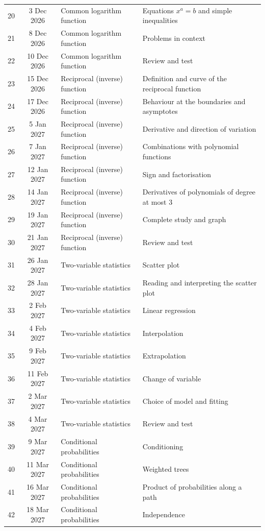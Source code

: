 \begin{longtable}{cclp{}}
20 & 3 Dec 2026 & Common logarithm function & Equations $x^a=b$ and simple inequalities\\
21 & 8 Dec 2026 & Common logarithm function & Problems in context\\
22 & 10 Dec 2026 & Common logarithm function & Review and test\\
23 & 15 Dec 2026 & Reciprocal (inverse) function & Definition and curve of the reciprocal function\\
24 & 17 Dec 2026 & Reciprocal (inverse) function & Behaviour at the boundaries and asymptotes\\
25 & 5 Jan 2027 & Reciprocal (inverse) function & Derivative and direction of variation\\
26 & 7 Jan 2027 & Reciprocal (inverse) function & Combinations with polynomial functions\\
27 & 12 Jan 2027 & Reciprocal (inverse) function & Sign and factorisation\\
28 & 14 Jan 2027 & Reciprocal (inverse) function & Derivatives of polynomials of degree at most 3\\
29 & 19 Jan 2027 & Reciprocal (inverse) function & Complete study and graph\\
30 & 21 Jan 2027 & Reciprocal (inverse) function & Review and test\\
31 & 26 Jan 2027 & Two-variable statistics & Scatter plot\\
32 & 28 Jan 2027 & Two-variable statistics & Reading and interpreting the scatter plot\\
33 & 2 Feb 2027 & Two-variable statistics & Linear regression\\
34 & 4 Feb 2027 & Two-variable statistics & Interpolation\\
35 & 9 Feb 2027 & Two-variable statistics & Extrapolation\\
36 & 11 Feb 2027 & Two-variable statistics & Change of variable\\
37 & 2 Mar 2027 & Two-variable statistics & Choice of model and fitting\\
38 & 4 Mar 2027 & Two-variable statistics & Review and test\\
39 & 9 Mar 2027 & Conditional probabilities & Conditioning\\
40 & 11 Mar 2027 & Conditional probabilities & Weighted trees\\
41 & 16 Mar 2027 & Conditional probabilities & Product of probabilities along a path\\
42 & 18 Mar 2027 & Conditional probabilities & Independence\\

\end{longtable}
